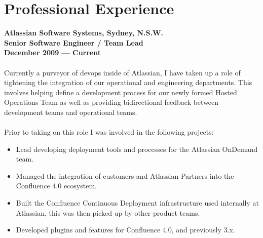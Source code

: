 \documentclass[a4paper]{article}
\begin{document}
\section*{Professional Experience}
\textbf{Atlassian Software Systems, Sydney, N.S.W.\\Senior Software Engineer / Team Lead\\December 2009 --- Current}\\\\
Currently a purveyor of devops inside of Atlassian, I have taken up a role of tightening the integration of our operational and engineering departments. This involves helping define a development process for our newly formed Hosted Operations Team as well as providing bidirectional feedback between development teams and operational teams.\\\\
Prior to taking on this role I was involved in the following projects:
\begin{itemize}
\item Lead developing deployment tools and processes for the Atlassian OnDemand team.
\item Managed the integration of customers and Atlassian Partners into the Confluence 4.0 ecosystem.
\item Built the Confluence Continuous Deployment infrastructure used internally at Atlassian, this was then picked up by other product teams.
\item Developed plugins and features for Confluence 4.0, and previously 3.x.
\end{itemize}
\newpage
\ryanHeader
\end{document}
